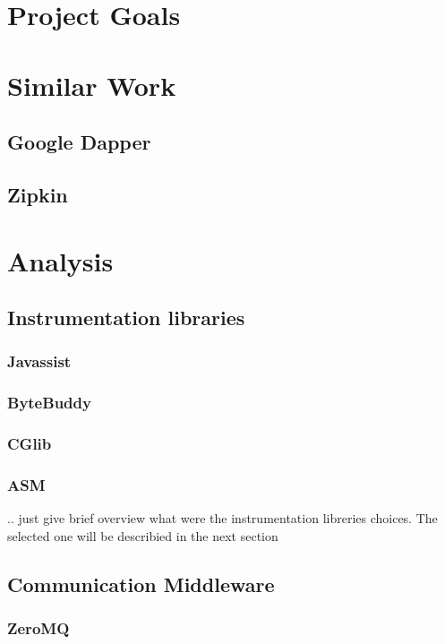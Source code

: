 \documentclass[12pt,a4paper]{report}
\begin{document}



\tableofcontents


\chapter{Project Goals}
\chapter{Similar Work}
\section{Google Dapper}
\section{Zipkin}
\chapter{Analysis}
\section{Instrumentation libraries}
\subsection{Javassist}
\subsection{ByteBuddy}
\subsection{CGlib}
\subsection{ASM}
.. just give brief overview what were the instrumentation libreries choices. The selected one will be describied in the next section
\section{Communication Middleware}
\subsection{ZeroMQ}
\end{document}
